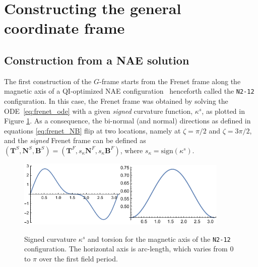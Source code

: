 \documentclass[12pt]{iopart}
\newcommand\hladdedrev[1]{#1} %
\newcommand\hlchangedrev[1]{#1} %
\newcommand\Tfrenet{{\bm T}^F}
\newcommand\Nfrenet{{\bm N}^F}
\newcommand\Bfrenet{{\bm B}^F}
\newcommand\TfrenetS{{\bm T}^S}
\newcommand\NfrenetS{{\bm N}^S}
\newcommand\BfrenetS{{\bm B}^S}
\newcommand\GFF{$G$-frame}
\newcommand\binormal[1]{bi-normal{#1}}
\begin{document}
\section{\hladdedrev{Constructing the general coordinate frame}\label{sec:construction}}
\subsection{\hladdedrev{Construction from a NAE solution}\label{sec:gff_cosntruction_frenet}}

\hlchangedrev{The first construction of the \GFF{} starts from} the Frenet frame along the magnetic axis of a QI-optimized NAE configuration~\cite{plunk2024-QI} henceforth called the \texttt{N2-12} configuration. \hlchangedrev{In this case, the Frenet frame} was obtained by solving the ODE~\eqref{eq:frenet_ode} with a given \emph{signed} curvature function, $\kappa^s$, as plotted in Figure \ref{fig:signed-curvature-N2-12}\hlchangedrev{. As a consequence, the \binormal{ } (and normal) directions as defined in equations \eqref{eq:frenet_NB} flip at two locations, namely at $\zeta = \pi/2$ and $\zeta = 3\pi/2$, and the {\em signed} Frenet frame can be defined as $(\TfrenetS, \NfrenetS, \BfrenetS) = (\Tfrenet, s_\kappa\Nfrenet, s_\kappa\Bfrenet)$, where $s_\kappa = \text{sign}(\kappa^s)$. }

\begin{figure}[htbp!]
    \centering
    \includegraphics[width=0.45\textwidth]{pics/signed-curvature-N2-12.pdf}\includegraphics[width=0.45\textwidth]{pics/torsion-N2-12.pdf}
    \caption{\hladdedrev{Signed curvature $\kappa^s$ and torsion for the magnetic axis of the \texttt{N2-12} configuration.  The horizontal axis is arc-length, which varies from $0$ to $\pi$ over the first field period.}}
    \label{fig:signed-curvature-N2-12}
\end{figure}
\end{document}
